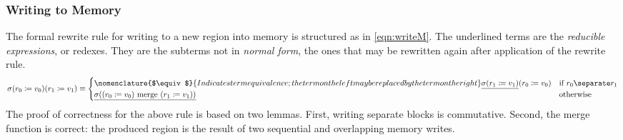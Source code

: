 \subsubsection{Writing to Memory}
The formal rewrite rule for writing to a new region into memory
is structured as in \cref{eqn:writeM}.
The underlined terms are the \emph{reducible expressions},%
or redexes.
They are the subterms not in \emph{normal form},%
the ones that may be rewritten again after application of the rewrite rule.
\begin{equation}
  \sigma(r_0\coloneqq v_0)(r_1\coloneqq v_1)\equiv\begin{cases}%
  \nomenclature{$\equiv$}{Indicates term equivalence;
    the term on the left may be replaced by the term on the right}
    \underline{\sigma(r_1\coloneqq v_1)}(r_0\coloneqq v_0) &
      \text{if } r_0\separate r_1 \\
    \underline{\sigma((r_0\coloneqq v_0)\mmerge(r_1\coloneqq v_1))} &
      \text{otherwise}
  \end{cases}\label{eqn:writeM}
\end{equation}
The proof of correctness for the above rule is based on two lemmas.
First, writing separate blocks is commutative.
Second, the merge function is correct:
the produced region is the result of two sequential and overlapping memory writes.

